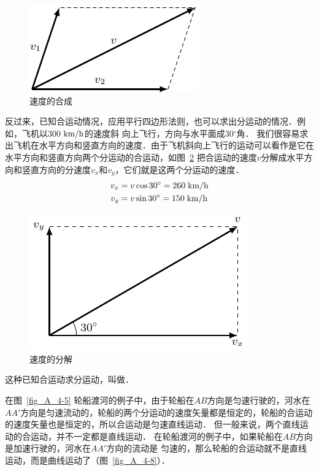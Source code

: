 \begin{figure}[htbp]
    \centering
    \includegraphics{fig/A/4-6.pdf}
    \caption{速度的合成}\label{fig_A_4-6}
\end{figure}

反过来，已知合运动情况，应用平行四边形法则，也可以求出分运动的情况．例如，飞机以300$\;\text{km}/\text{h}$的速度斜
向上飞行，方向与水平面成30$^\circ$角．
我们很容易求出飞机在水平方向和竖直方向的速度．由于飞机斜向上飞行的运动可以看作是它在水平方向和竖直方向两个分运动的合运动，如图~\ref{fig_A_4-7} 把合运动的速度$v$分解成水平方向和竖直方向的分速度$v_x$和$v_y$，它们就是这两个分运动的速度．
\[\begin{split}
v_x&=v\cos30^{\circ}=260\;\text{km}/\text{h}\\
v_y&=v\sin 30^{\circ}=150\;\text{km}/\text{h}\\
\end{split} \]

\begin{figure}[htbp]
    \centering
    \includegraphics{fig/A/4-7.pdf}
    \caption{速度的分解}\label{fig_A_4-7}
\end{figure}

这种已知合运动求分运动，叫做．

在图~\ref{fig_A_4-5} 轮船渡河的例子中，由于轮船在$AB$方向是匀速行驶的，河水在$AA'$方向是匀速流动的，轮船的两个分运动的速度矢量都是恒定的，轮船的合运动的速度矢量也是恒定的，所以合运动是匀速直线运动．
但一般来说，两个直线运动的合运动，并不一定都是直线运动．
在轮船渡河的例子中，如果轮船在$AB$方向是加速行驶的，河水在$AA'$方向的流动是
匀速的，那么轮船的合运动就不是直线运动，而是曲线运动了（图~\ref{fig_A_4-8}）．

